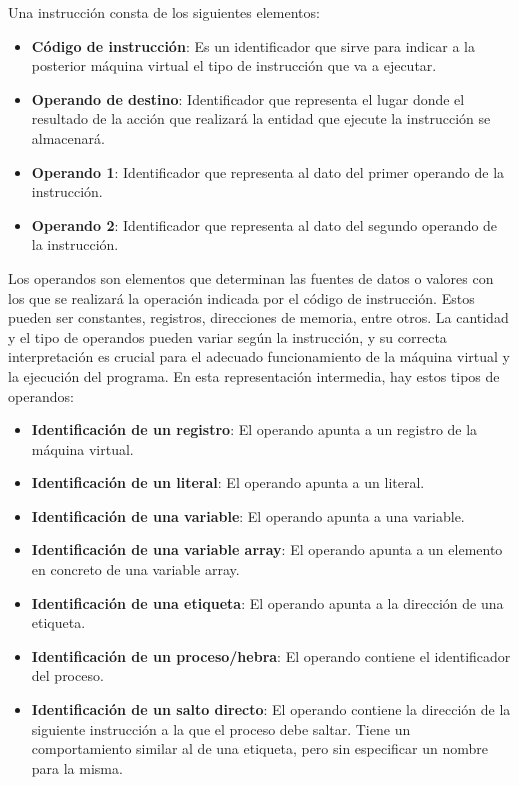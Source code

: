 \noindent
Una instrucción consta de los siguientes elementos:

\begin{itemize}
    \item \textbf{Código de instrucción}: Es un identificador que sirve para indicar a la posterior máquina virtual el tipo de instrucción que va a ejecutar.
    \item \textbf{Operando de destino}: Identificador que representa el lugar donde el resultado de la acción que realizará la entidad que ejecute la instrucción se almacenará.
    \item \textbf{Operando 1}: Identificador que representa al dato del primer operando de la instrucción.
    \item \textbf{Operando 2}: Identificador que representa al dato del segundo operando de la instrucción.
\end{itemize}

Los operandos son elementos que determinan las fuentes de datos o valores con los que se realizará la operación indicada por el código de instrucción. Estos pueden ser constantes, registros, direcciones de memoria, entre otros. La cantidad y el tipo de operandos pueden variar según la instrucción, y su correcta interpretación es crucial para el adecuado funcionamiento de la máquina virtual y la ejecución del programa. En esta representación intermedia, hay estos tipos de operandos:

\begin{itemize}
    \item \textbf{Identificación de un registro}: El operando apunta a un registro de la máquina virtual.
    \item \textbf{Identificación de un literal}: El operando apunta a un literal.
    \item \textbf{Identificación de una variable}: El operando apunta a una variable.
    \item \textbf{Identificación de una variable array}: El operando apunta a un elemento en concreto de una variable array.
    \item \textbf{Identificación de una etiqueta}: El operando apunta a la dirección de una etiqueta.
    \item \textbf{Identificación de un proceso/hebra}: El operando contiene el identificador del proceso.
    \item \textbf{Identificación de un salto directo}: El operando contiene la dirección de la siguiente instrucción a la que el proceso debe saltar. Tiene un comportamiento similar al de una etiqueta, pero sin especificar un nombre para la misma.
\end{itemize}

